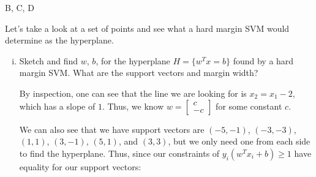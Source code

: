 \begin{Parts}
\begin{solution}
B, C, D
\end{solution}

\newpage
\Part

Let's take a look at a set of points and see what a hard margin SVM would determine as the hyperplane.

\begin{enumerate}[i.] 

\item Sketch and find $w$, $b$, for the hyperplane $H = \{w^Tx = b\}$ found by a hard margin SVM. What are the support vectors and margin width?


\begin{solution}


By inspection, one can see that the line we are looking for is $x_2 = x_1 - 2$, which has a slope of $1$. Thus, we know $w = \begin{bmatrix} c \\ -c \end{bmatrix}$ for some constant $c$.

We can also see that we have support vectors are $(-5, -1)$, $(-3, -3)$, $(1,1)$, $(3, -1)$, $(5,1)$, and $(3, 3)$, but we only need one from each side to find the hyperplane. Thus, since our constraints of $y_i(w^T x_i + b) \geq 1$ have equality for our support vectors:


\end{solution}
\end{enumerate}
\end{Parts}
